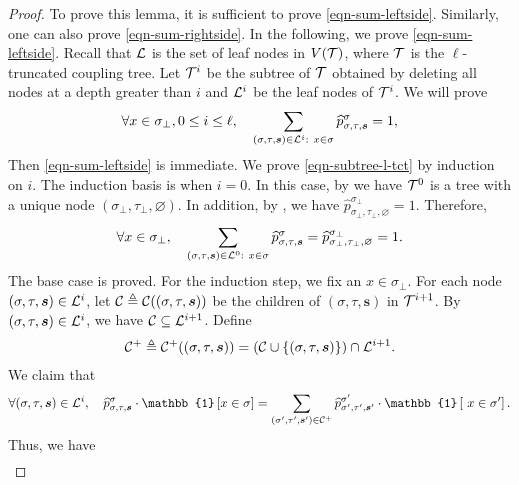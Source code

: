\documentclass[11pt]{article}
\newcommand{\id}[1]{\mathbb{1}\left[#1\right]}
\newcommand{\seqS}{\boldsymbol{s}}
\begin{document}
\begin{proof}
    To prove this lemma, it is sufficient to prove \eqref{eqn-sum-leftside}. Similarly, one can also prove \eqref{eqn-sum-rightside}.
    In the following, we prove \eqref{eqn-sum-leftside}.
    Recall that $\mathcal{L}$ is the set of leaf nodes in $V(\mathcal{T})$, where $\mathcal{T}$ is the $\ell$-truncated coupling tree. 
    Let $\mathcal{T}^{i}$ be the subtree of $\mathcal{T}$ obtained by deleting all nodes at a depth greater than $i$
    and $\mathcal{L}^{i}$ be the leaf nodes of $\mathcal{T}^{i}$.
    We will prove 
    \begin{align}\label{eqn-subtree-l-tct}
        \forall x\in \sigma_\bot,0\leq i\leq \ell, \quad \sum_{(\sigma,\tau, \seqS)\in \+L^i: \ x\in \sigma} \widehat{p}^{\sigma}_{\sigma,\tau,\seqS}=1,
    \end{align}
    Then \eqref{eqn-sum-leftside} is immediate.    
    We prove \eqref{eqn-subtree-l-tct} by induction on $i$.
    The induction basis is when $i = 0$.
    In this case, by  we have $\mathcal{T}^0$ is a tree with a unique node $(\sigma_\bot, \tau_\bot, \varnothing)$.
    In addition, by , we have 
    $\widehat{p}^{\sigma_\bot}_{\sigma_\bot,\tau_\bot, \varnothing} = 1$.
    Therefore, 
     \begin{align*}
        \forall x\in \sigma_\bot, \quad \sum_{(\sigma,\tau, \seqS)\in \+L^0: \ x\in \sigma} \widehat{p}^{\sigma}_{\sigma,\tau,\seqS}=\widehat{p}^{\sigma_\bot}_{\sigma_\bot,\tau_\bot, \varnothing} = 1.
    \end{align*}
    The base case is proved. For the induction step, we fix an $x\in \sigma_\bot$.    
    For each node $(\sigma,\tau,\seqS)\in \+L^i$,
    let $\+C \triangleq \+C((\sigma,\tau,\seqS))$ be the children of $(\sigma,\tau,\seqS)$ in $\mathcal{T}^{i+1}$. 
    By $(\sigma,\tau,\seqS) \in \+L^{i}$, we have 
    $\mathcal{C}\subseteq \mathcal{L}^{i+1}$.
    Define 
    \begin{align}\label{def-cplus}
    \+C^{+} \triangleq \+C^{+}((\sigma,\tau,\seqS)) = \left(\+C\cup \{(\sigma,\tau,\seqS)\}\right)\cap \+L^{i+1}.
    \end{align}
    We claim that 
    \begin{align}\label{eq-extension-sum}
    \forall (\sigma,\tau,\seqS)\in \+L^i,\quad \widehat{p}^{\sigma}_{\sigma,\tau,\seqS}\cdot \id{x \in \sigma} = \sum_{(\sigma',\tau', \seqS')\in \+C^{+}} \widehat{p}^{\sigma'}_{\sigma',\tau',\seqS'}\cdot \id{\ x\in \sigma'}.
    \end{align}
    Thus, we have 
    \begin{align*}

\end{align*}
\end{proof}
\end{document}
